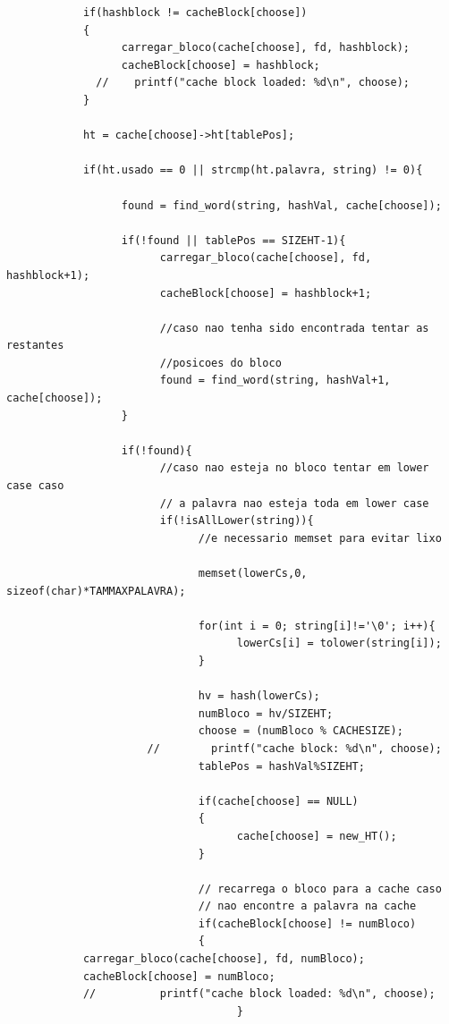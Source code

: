 \begin{verbatim}
            if(hashblock != cacheBlock[choose])
            {
                  carregar_bloco(cache[choose], fd, hashblock);
                  cacheBlock[choose] = hashblock;
              //	printf("cache block loaded: %d\n", choose);
            }

            ht = cache[choose]->ht[tablePos];

            if(ht.usado == 0 || strcmp(ht.palavra, string) != 0){

                  found = find_word(string, hashVal, cache[choose]);

                  if(!found || tablePos == SIZEHT-1){
                        carregar_bloco(cache[choose], fd, hashblock+1);
                        cacheBlock[choose] = hashblock+1;

                        //caso nao tenha sido encontrada tentar as restantes
                        //posicoes do bloco
                        found = find_word(string, hashVal+1, cache[choose]);
                  }

                  if(!found){
                        //caso nao esteja no bloco tentar em lower case caso
                        // a palavra nao esteja toda em lower case
                        if(!isAllLower(string)){	
                              //e necessario memset para evitar lixo

                              memset(lowerCs,0, sizeof(char)*TAMMAXPALAVRA);

                              for(int i = 0; string[i]!='\0'; i++){
                                    lowerCs[i] = tolower(string[i]);
                              }

                              hv = hash(lowerCs);
                              numBloco = hv/SIZEHT;
                              choose = (numBloco % CACHESIZE);
                      //		printf("cache block: %d\n", choose);
                              tablePos = hashVal%SIZEHT;

                              if(cache[choose] == NULL)
                              {
                                    cache[choose] = new_HT();
                              }

                              // recarrega o bloco para a cache caso 
                              // nao encontre a palavra na cache
                              if(cacheBlock[choose] != numBloco)
                              {
            carregar_bloco(cache[choose], fd, numBloco);
            cacheBlock[choose] = numBloco;
            //			printf("cache block loaded: %d\n", choose);
                                    }


\end{verbatim}
